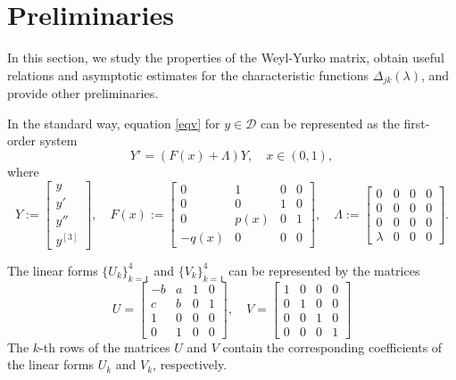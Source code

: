 \documentclass[a4paper,12pt]{article}
\newcommand{\la}{\lambda}
\theoremstyle{plain}
\numberwithin{equation}{section}
\theoremstyle{definition}
\theoremstyle{remark}
\begin{document}
\section{Preliminaries} \label{sec:prelim}

In this section, we study the properties of the Weyl-Yurko matrix, obtain useful relations and asymptotic estimates for the characteristic functions $\Delta_{jk}(\la)$, and provide other preliminaries.

In the standard way, equation \eqref{eqv} for $y \in \mathcal D$ can be represented as the first-order system
\begin{equation} \label{sys}
Y' = (F(x) + \Lambda) Y, \quad x \in (0,1),
\end{equation}
where
\begin{equation} \label{defF}
Y := \begin{bmatrix}
 y \\ y' \\ y'' \\ y^{[3]}
\end{bmatrix}, \quad
F(x) := \begin{bmatrix}
            0 & 1 & 0 & 0 \\
            0 & 0 & 1 & 0 \\
            0 & p(x) & 0 & 1\\
            -q(x) & 0 & 0 & 0
        \end{bmatrix}, \quad
\Lambda := \begin{bmatrix}
                0 & 0 & 0 & 0 \\
                0 & 0 & 0 & 0 \\
                0 & 0 & 0 & 0 \\
                \la & 0 & 0 & 0             
            \end{bmatrix}.
\end{equation}

The linear forms $\{ U_k \}_{k =1}^4$ and $\{ V_k \}_{k = 1}^4$ can be represented by the matrices
\begin{equation} \label{matrUV}
U = \begin{bmatrix}
        -b & a & 1 & 0 \\
        c & b & 0 & 1 \\
        1 & 0 & 0 & 0 \\
        0 & 1 & 0 & 0
    \end{bmatrix}, \quad V = \begin{bmatrix}
        1 & 0 & 0 & 0 \\
        0 & 1 & 0 & 0 \\
        0 & 0 & 1 & 0 \\
        0 & 0 & 0 & 1
    \end{bmatrix}
\end{equation}
The $k$-th rows of the matrices $U$ and $V$ contain the corresponding coefficients of the linear forms $U_k$ and $V_k$, respectively.
\end{document}
